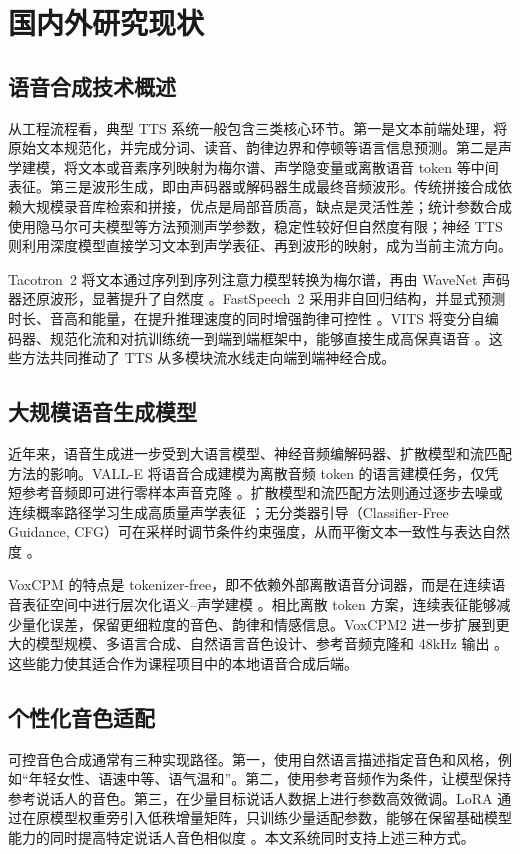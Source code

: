 \documentclass[UTF8,a4paper,12pt]{ctexart}
\begin{document}
\section{国内外研究现状}
\subsection{语音合成技术概述}
从工程流程看，典型 TTS 系统一般包含三类核心环节。第一是文本前端处理，将原始文本规范化，并完成分词、读音、韵律边界和停顿等语言信息预测。第二是声学建模，将文本或音素序列映射为梅尔谱、声学隐变量或离散语音 token 等中间表征。第三是波形生成，即由声码器或解码器生成最终音频波形。传统拼接合成依赖大规模录音库检索和拼接，优点是局部音质高，缺点是灵活性差；统计参数合成使用隐马尔可夫模型等方法预测声学参数，稳定性较好但自然度有限；神经 TTS 则利用深度模型直接学习文本到声学表征、再到波形的映射，成为当前主流方向。

Tacotron~2 将文本通过序列到序列注意力模型转换为梅尔谱，再由 WaveNet 声码器还原波形，显著提升了自然度 \cite{shen2018tacotron2}。FastSpeech~2 采用非自回归结构，并显式预测时长、音高和能量，在提升推理速度的同时增强韵律可控性 \cite{ren2021fastspeech2}。VITS 将变分自编码器、规范化流和对抗训练统一到端到端框架中，能够直接生成高保真语音 \cite{kim2021vits}。这些方法共同推动了 TTS 从多模块流水线走向端到端神经合成。

\subsection{大规模语音生成模型}
近年来，语音生成进一步受到大语言模型、神经音频编解码器、扩散模型和流匹配方法的影响。VALL-E 将语音合成建模为离散音频 token 的语言建模任务，仅凭短参考音频即可进行零样本声音克隆 \cite{wang2023valle}。扩散模型和流匹配方法则通过逐步去噪或连续概率路径学习生成高质量声学表征 \cite{lipman2023flowmatching}；无分类器引导（Classifier-Free Guidance, CFG）可在采样时调节条件约束强度，从而平衡文本一致性与表达自然度 \cite{ho2022cfg}。

VoxCPM 的特点是 tokenizer-free，即不依赖外部离散语音分词器，而是在连续语音表征空间中进行层次化语义--声学建模 \cite{zhou2025voxcpm}。相比离散 token 方案，连续表征能够减少量化误差，保留更细粒度的音色、韵律和情感信息。VoxCPM2 进一步扩展到更大的模型规模、多语言合成、自然语言音色设计、参考音频克隆和 48kHz 输出 \cite{voxcpm2_2026}。这些能力使其适合作为课程项目中的本地语音合成后端。

\subsection{个性化音色适配}
可控音色合成通常有三种实现路径。第一，使用自然语言描述指定音色和风格，例如“年轻女性、语速中等、语气温和”。第二，使用参考音频作为条件，让模型保持参考说话人的音色。第三，在少量目标说话人数据上进行参数高效微调。LoRA 通过在原模型权重旁引入低秩增量矩阵，只训练少量适配参数，能够在保留基础模型能力的同时提高特定说话人音色相似度 \cite{hu2022lora}。本文系统同时支持上述三种方式。
\end{document}
